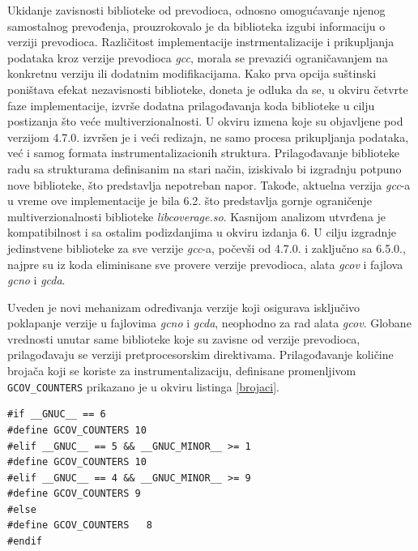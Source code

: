 \documentclass[12pt,oneside]{memoir}
\newcommand{\kod}[1]{\texttt{#1}}
\newcommand{\strano}[1]{\textit{#1}}
\begin{document}
Ukidanje zavisnosti biblioteke od prevodioca, odnosno omogućavanje njenog samostalnog prevođenja, prouzrokovalo je da biblioteka izgubi informaciju o verziji prevodioca. Različitost implementacije instrmentalizacije i prikupljanja podataka kroz verzije prevodioca \strano{gcc}, morala se prevazići ograničavanjem na konkretnu verziju ili dodatnim modifikacijama. Kako prva opcija suštinski poništava efekat nezavisnosti biblioteke, doneta je odluka da se, u okviru četvrte faze implementacije, izvrše dodatna prilagođavanja koda biblioteke u cilju postizanja što veće multiverzionalnosti. U okviru izmena koje su objavljene pod verzijom 4.7.0. izvršen je i veći redizajn, ne samo procesa prikupljanja podataka, već i samog formata instrumentalizacionih struktura. Prilagođavanje biblioteke radu sa strukturama definisanim na stari način, iziskivalo bi izgradnju potpuno nove biblioteke, što predstavlja nepotreban napor. Takođe, aktuelna verzija \strano{gcc}-a u vreme ove implementacije je bila 6.2. što predstavlja gornje ograničenje multiverzionalnosti biblioteke \strano{libcoverage.so}. Kasnijom analizom utvrđena je kompatibilnost i sa ostalim podizdanjima u okviru izdanja 6. U cilju izgradnje jedinstvene biblioteke za sve verzije \strano{gcc}-a, počevši od 4.7.0. i zaključno sa 6.5.0., najpre su iz koda eliminisane sve provere verzije prevodioca, alata \strano{gcov} i fajlova \strano{gcno} i \strano{gcda}. 

Uveden je novi mehanizam određivanja verzije koji osigurava isključivo poklapanje verzije u fajlovima \strano{gcno} i \strano{gcda}, neophodno za rad alata \strano{gcov}. 
Globane vrednosti unutar same biblioteke koje su zavisne od verzije prevodioca, prilagođavaju se verziji pretprocesorskim direktivama. Prilagođavanje količine brojača koji se koriste za instrumentalizaciju, definisane promenljivom \kod{GCOV\_COUNTERS} prikazano je u okviru listinga \ref{brojaci}.

\newpage

\begin{lstlisting}[caption={Definisanje količine brojača u zavisnosti od verzije prevodioca},frame=single, label=brojaci]
#if __GNUC__ == 6
#define GCOV_COUNTERS 10
#elif __GNUC__ == 5 && __GNUC_MINOR__ >= 1
#define GCOV_COUNTERS 10
#elif __GNUC__ == 4 && __GNUC_MINOR__ >= 9
#define GCOV_COUNTERS 9
#else
#define GCOV_COUNTERS   8
#endif
\end{lstlisting}
\end{document}
